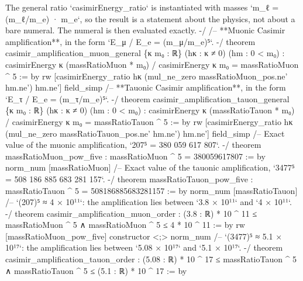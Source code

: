 \documentclass[11pt,a4paper]{article}
\begin{document}
{\mbox{}
The general ratio `casimirEnergy\_\allowbreak{}ratio` is instantiated with masses
`m\_\allowbreak{}ℓ = (m\_\allowbreak{}ℓ/m\_\allowbreak{}e) · m\_\allowbreak{}e`, so the result is a statement about the physics, not
about a bare numeral.  The numeral is then evaluated exactly.
-/
\mbox{}
/-- **Muonic Casimir amplification**, in the form `E\_\allowbreak{}μ / E\_\allowbreak{}e = (m\_\allowbreak{}μ/m\_\allowbreak{}e)⁵`. -/
theorem casimir\_\allowbreak{}amplification\_\allowbreak{}muon\_\allowbreak{}general \{κ m₀ : ℝ\} (hκ : κ ≠ 0) (hm : 0 \textless{} m₀) :
    casimirEnergy κ (massRatioMuon * m₀) / casimirEnergy κ m₀ = massRatioMuon \textasciicircum{} 5 := by
  rw [casimirEnergy\_\allowbreak{}ratio hκ (mul\_\allowbreak{}ne\_\allowbreak{}zero massRatioMuon\_\allowbreak{}pos.ne' hm.ne') hm.ne']
  field\_\allowbreak{}simp
\mbox{}
/-- **Tauonic Casimir amplification**, in the form `E\_\allowbreak{}τ / E\_\allowbreak{}e = (m\_\allowbreak{}τ/m\_\allowbreak{}e)⁵`. -/
theorem casimir\_\allowbreak{}amplification\_\allowbreak{}tauon\_\allowbreak{}general \{κ m₀ : ℝ\} (hκ : κ ≠ 0) (hm : 0 \textless{} m₀) :
    casimirEnergy κ (massRatioTauon * m₀) / casimirEnergy κ m₀ = massRatioTauon \textasciicircum{} 5 := by
  rw [casimirEnergy\_\allowbreak{}ratio hκ (mul\_\allowbreak{}ne\_\allowbreak{}zero massRatioTauon\_\allowbreak{}pos.ne' hm.ne') hm.ne']
  field\_\allowbreak{}simp
\mbox{}
/-- Exact value of the muonic amplification, `207⁵ = 380 059 617 807`. -/
theorem massRatioMuon\_\allowbreak{}pow\_\allowbreak{}five : massRatioMuon \textasciicircum{} 5 = 380059617807 := by
  norm\_\allowbreak{}num [massRatioMuon]
\mbox{}
/-- Exact value of the tauonic amplification, `3477⁵ = 508 186 885 683 281 157`. -/
theorem massRatioTauon\_\allowbreak{}pow\_\allowbreak{}five : massRatioTauon \textasciicircum{} 5 = 508186885683281157 := by
  norm\_\allowbreak{}num [massRatioTauon]
\mbox{}
/-- `(207)⁵ ≈ 4 × 10¹¹`: the amplification lies between `3.8 × 10¹¹` and `4 × 10¹¹`. -/
theorem casimir\_\allowbreak{}amplification\_\allowbreak{}muon\_\allowbreak{}order :
    (3.8 : ℝ) * 10 \textasciicircum{} 11 ≤ massRatioMuon \textasciicircum{} 5 ∧ massRatioMuon \textasciicircum{} 5 ≤ 4 * 10 \textasciicircum{} 11 := by
  rw [massRatioMuon\_\allowbreak{}pow\_\allowbreak{}five]
  constructor \textless{};\textgreater{} norm\_\allowbreak{}num
\mbox{}
/-- `(3477)⁵ ≈ 5.1 × 10¹⁷`: the amplification lies between `5.08 × 10¹⁷` and `5.1 × 10¹⁷`. -/
theorem casimir\_\allowbreak{}amplification\_\allowbreak{}tauon\_\allowbreak{}order :
    (5.08 : ℝ) * 10 \textasciicircum{} 17 ≤ massRatioTauon \textasciicircum{} 5 ∧ massRatioTauon \textasciicircum{} 5 ≤ (5.1 : ℝ) * 10 \textasciicircum{} 17 := by
}
\end{document}
